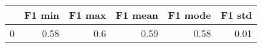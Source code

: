 \begin{tabular}{lrrrrr}
\toprule
{} &  F1 min &  F1 max &  F1 mean &  F1 mode &  F1 std \\
\midrule
0 &    0.58 &     0.6 &     0.59 &     0.58 &    0.01 \\
\bottomrule
\end{tabular}
